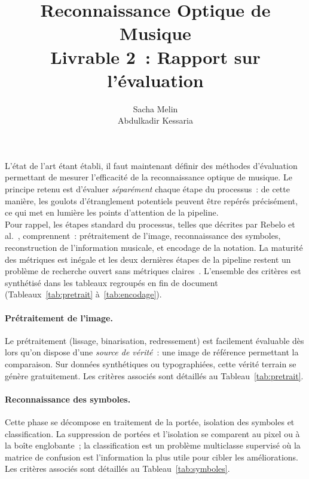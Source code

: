 \documentclass[a4paper,10pt]{article}
\title{\vspace{-1.5cm}\textbf{Reconnaissance Optique de Musique \\ \large Livrable 2~: Rapport sur l'évaluation}}
\author{Sacha Melin \\ Abdulkadir Kessaria}
\date{}
\begin{document}
\maketitle

L'état de l'art étant établi, il faut maintenant définir des méthodes d'évaluation permettant de mesurer l'efficacité de la reconnaissance optique de musique. Le principe retenu est d'évaluer \emph{séparément} chaque étape du processus~: de cette manière, les goulots d'étranglement potentiels peuvent être repérés précisément, ce qui met en lumière les points d'attention de la pipeline.\\

Pour rappel, les étapes standard du processus, telles que décrites par Rebelo et al.~\cite{Rebelo2012-jn}, comprennent~: prétraitement de l'image, reconnaissance des symboles, reconstruction de l'information musicale, et encodage de la notation. La maturité des métriques est inégale et les deux dernières étapes de la pipeline restent un problème de recherche ouvert sans métriques claires~\cite{mengarelli2019,byrd2015}. L'ensemble des critères est synthétisé dans les tableaux regroupés en fin de document (Tableaux~\ref{tab:pretrait} à~\ref{tab:encodage}).

\paragraph{Prétraitement de l'image.}
Le prétraitement (lissage, binarisation, redressement) est facilement évaluable dès lors qu'on dispose d'une \emph{source de vérité}~: une image de référence permettant la comparaison. Sur données synthétiques ou typographiées, cette vérité terrain se génère gratuitement. Les critères associés sont détaillés au Tableau~\ref{tab:pretrait}.

\paragraph{Reconnaissance des symboles.}
Cette phase se décompose en traitement de la portée, isolation des symboles et classification. La suppression de portées et l'isolation se comparent au pixel ou à la boîte englobante~; la classification est un problème multiclasse supervisé où la matrice de confusion est l'information la plus utile pour cibler les améliorations. Les critères associés sont détaillés au Tableau~\ref{tab:symboles}.
\end{document}
